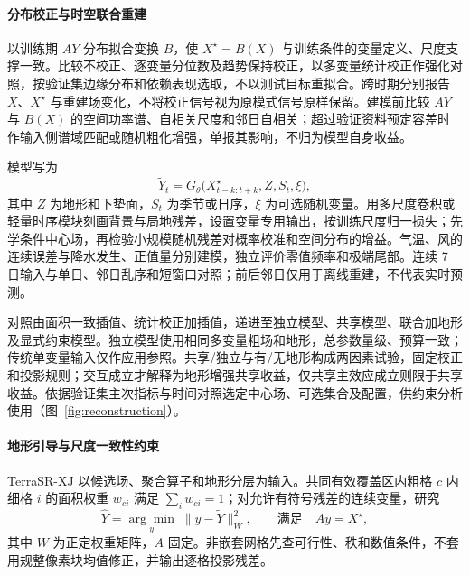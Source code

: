\paragraph{分布校正与时空联合重建}
以训练期 $AY$ 分布拟合变换 $B$，使 $X^{\star}=B(X)$ 与训练条件的变量定义、尺度支撑一致。比较不校正、逐变量分位数及趋势保持校正，以多变量统计校正作强化对照，按验证集边缘分布和依赖表现选取\cite{Lange2019ISIMIP,Cannon2018MBCn}，不以测试目标重拟合。跨时期分别报告 $X$、$X^{\star}$ 与重建场变化，不将校正信号视为原模式信号原样保留。建模前比较 $AY$ 与 $B(X)$ 的空间功率谱、自相关尺度和邻日自相关；超过验证资料预定容差时作输入侧谱域匹配或随机粗化增强，单报其影响，不归为模型自身收益。

模型写为
\begin{equation}
\widetilde{Y}_{t}=G_{\theta}\bigl(X^{\star}_{t-k:t+k},Z,S_t,\xi\bigr),
\end{equation}
其中 $Z$ 为地形和下垫面，$S_t$ 为季节或日序，$\xi$ 为可选随机变量。用多尺度卷积或轻量时序模块刻画背景与局地残差，设置变量专用输出，按训练尺度归一损失；先学条件中心场，再检验小规模随机残差对概率校准和空间分布的增益。气温、风的连续误差与降水发生、正值量分别建模，独立评价零值频率和极端尾部。连续 7 日输入与单日、邻日乱序和短窗口对照；前后邻日仅用于离线重建，不代表实时预测。

对照由面积一致插值、统计校正加插值，递进至独立模型、共享模型、联合加地形及显式约束模型。独立模型使用相同多变量粗场和地形，总参数量级、预算一致；传统单变量输入仅作应用参照。共享/独立与有/无地形构成两因素试验，固定校正和投影规则；交互成立才解释为地形增强共享收益，仅共享主效应成立则限于共享收益。依据验证集主次指标与时间对照选定中心场、可选集合及配置，供约束分析使用（图~\ref{fig:reconstruction}）。

\paragraph{地形引导与尺度一致性约束}
TerraSR-XJ 以候选场、聚合算子和地形分层为输入。共同有效覆盖区内粗格 $c$ 内细格 $i$ 的面积权重 $w_{ci}$ 满足 $\sum_iw_{ci}=1$；对允许有符号残差的连续变量，研究
\begin{equation}
\widehat{Y}=\underset{y}{\arg\min}\;\|y-\widetilde{Y}\|_{W}^{2},
\qquad \text{满足}\quad Ay=X^{\star},
\end{equation}
其中 $W$ 为正定权重矩阵，$A$ 固定。非嵌套网格先查可行性、秩和数值条件，不套用规整像素块均值修正，并输出逐格投影残差。

